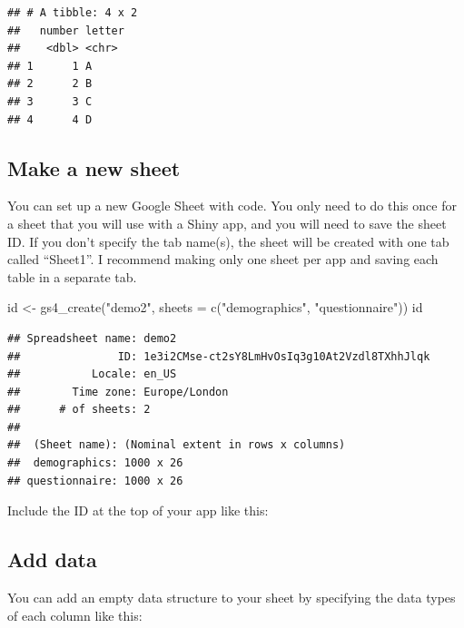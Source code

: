 \documentclass[
  oneside]{book}
\newenvironment{Shaded}{\begin{snugshade}}{\end{snugshade}}
\newcommand{\AttributeTok}[1]{\textcolor[rgb]{0.77,0.63,0.00}{#1}}
\newcommand{\FunctionTok}[1]{\textcolor[rgb]{0.00,0.00,0.00}{#1}}
\newcommand{\NormalTok}[1]{#1}
\newcommand{\OtherTok}[1]{\textcolor[rgb]{0.56,0.35,0.01}{#1}}
\newcommand{\StringTok}[1]{\textcolor[rgb]{0.31,0.60,0.02}{#1}}
\begin{document}
\begin{verbatim}
## # A tibble: 4 x 2
##   number letter
##    <dbl> <chr> 
## 1      1 A     
## 2      2 B     
## 3      3 C     
## 4      4 D
\end{verbatim}

\hypertarget{make-a-new-sheet}{%
\subsection{Make a new sheet}\label{make-a-new-sheet}}

You can set up a new Google Sheet with code. You only need to do this once for a sheet that you will use with a Shiny app, and you will need to save the sheet ID. If you don't specify the tab name(s), the sheet will be created with one tab called ``Sheet1''. I recommend making only one sheet per app and saving each table in a separate tab.

\begin{Shaded}
\begin{Highlighting}[]
\NormalTok{id }\OtherTok{\textless{}{-}} \FunctionTok{gs4\_create}\NormalTok{(}\StringTok{"demo2"}\NormalTok{, }\AttributeTok{sheets =} \FunctionTok{c}\NormalTok{(}\StringTok{"demographics"}\NormalTok{, }\StringTok{"questionnaire"}\NormalTok{))}
\NormalTok{id}
\end{Highlighting}
\end{Shaded}

\begin{verbatim}
## Spreadsheet name: demo2
##               ID: 1e3i2CMse-ct2sY8LmHvOsIq3g10At2Vzdl8TXhhJlqk
##           Locale: en_US
##        Time zone: Europe/London
##      # of sheets: 2
## 
##  (Sheet name): (Nominal extent in rows x columns)
##  demographics: 1000 x 26
## questionnaire: 1000 x 26
\end{verbatim}

Include the ID at the top of your app like this:

\hypertarget{add-data}{%
\subsection{Add data}\label{add-data}}

You can add an empty data structure to your sheet by specifying the data types of each column like this:
\end{document}
